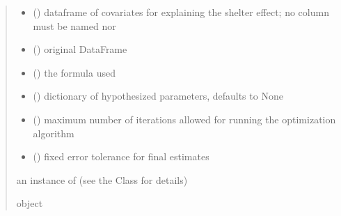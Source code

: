 \documentclass[letterpaper,10pt,english]{sphinxmanual}
\begin{document}
\begin{fulllineitems}
\begin{quote}
\begin{description}
\begin{itemize}
\item {} 
\sphinxAtStartPar
{} () \textendash{} dataframe of covariates for explaining the shelter effect;
no column must be named  nor 

\item {} 
\sphinxAtStartPar
{} () \textendash{} original DataFrame

\item {} 
\sphinxAtStartPar
{} () \textendash{} the formula used

\item {} 
\sphinxAtStartPar
{} (\sphinxstyleliteralemphasis{\sphinxupquote{, }}) \textendash{} dictionary of hypothesized parameters, defaults to None

\item {} 
\sphinxAtStartPar
{} () \textendash{} maximum number of iterations allowed for running the optimization algorithm

\item {} 
\sphinxAtStartPar
{} () \textendash{} fixed error tolerance for final estimates

\end{itemize}

\sphinxAtStartPar
an instance of  (see the Class for details)

\sphinxAtStartPar
object

\end{description}\end{quote}

\end{fulllineitems}

\end{document}
